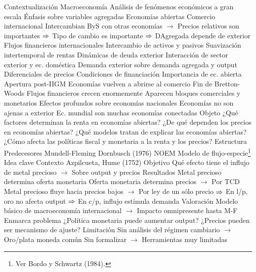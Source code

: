 \documentclass{nuevotema}
\begin{document}
\esquemalargo

\begin{esquemal}
	\1[] 
		\2 Contextualización
			\3 Macroeconomía
				\4 Análisis de fenómenos económicos a gran escala
				\4 Énfasis sobre variables agregadas
			\3 Economías abiertas
				\4 Comercio internacional
				\4[] Intercambian ByS con otras economías
				\4[] $\to$ Precios relativos son importantes
				\4[] $\then$ Tipo de cambio es importante
				\4[] $\then$ DAgregada depende de exterior
				\4 Flujos financieros internacionales
				\4[] Intercambio de activos y pasivos
				\4[] Suavización intertemporal de rentas
				\4[] Dinámicas de deuda exterior
				\4 Interacción de sector exterior y ec. doméstica
				\4[] Demanda exterior sobre demanda agregada y output
				\4[] Diferenciales de precios
				\4[] Condiciones de financiación
			\3 Importancia de ec. abierta
				\4 Apertura post-IIGM
				\4[] Economías vuelven a abrirse al comercio
				\4 Fin de Bretton-Woods
				\4[] Flujos financieros crecen enormemente
				\4 Aparecen bloques comerciales y monetarios
				\4[$\then$] Efectos profundos sobre economías nacionales
				\4[$\then$] Economías no son ajenas a exterior
				\4[$\then$] Ec. mundial son muchas economías conectadas
		\2 Objeto
			\3 ¿Qué factores determinan la renta en economías abiertas?
			\3 ¿De qué dependen los precios en economías abiertas?
			\3 ¿Qué modelos tratan de explicar las economías abiertas?
			\3 ¿Cómo afecta las políticas fiscal y monetaria a la renta y los precios?
		\2 Estructura
			\3 Predecesores
			\3 Mundell-Fleming
			\3 Dornbusch (1976)
			\3 NOEM
	\1 
		\2 Modelo de flujo-especie\footnote{Ver Bordo y Schwartz (1984).}
			\3 Idea clave
				\4 Contexto
				\4[] Azpilcueta, Hume (1752)
				\4 Objetivo
				\4[] Qué efecto tiene el influjo de metal precioso
				\4[] $\to$ Sobre output y precios
				\4 Resultados
				\4[] Metal precioso determina oferta monetaria
				\4[] Oferta monetaria determina precios
				\4[] $\to$ Por TCD
				\4[] Metal precioso fluye hacia precios bajos
				\4[] $\to$ Por ley de un sólo precio
				\4[] $\then$ En l/p, oro no afecta output
				\4[] $\then$ En c/p, influjo estimula demanda
			\3 Valoración
				\4 Modelo básico de macroeconomía internacional
				\4[] $\to$ Impacto omnipresente hasta M-F
				\4 Enmarca problema
				\4[] ¿Política monetaria puede aumentar output?
				\4[] ¿Precios pueden ser mecanismo de ajuste?
				\4 Limitación
				\4[] Sin análisis del régimen cambiario
				\4[] $\to$ Oro/plata moneda común
				\4[] Sin formalizar
				\4[] $\to$ Herramientas muy limitadas

\end{esquemal}
\end{document}
